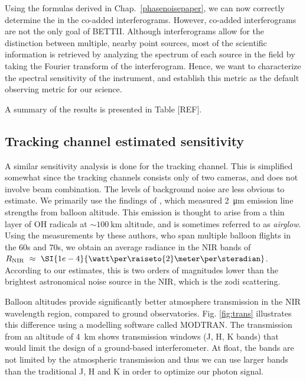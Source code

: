 Using the formulas derived in Chap.~\ref{phasenoisepaper}, we can now correctly determine the \SNR in the co-added interferograms. However, co-added interferograms are not the only goal of BETTII. Although interferograms allow for the distinction between multiple, nearby point sources, most of the scientific information is retrieved by analyzing the spectrum of each source in the field by taking the Fourier transform of the interferogram. Hence, we want to characterize the spectral sensitivity of the instrument, and establish this metric as the default observing metric for our science.

A summary of the results is presented in Table [REF].

\subsection{Tracking channel estimated sensitivity}
A similar sensitivity analysis is done for the tracking channel. This is simplified somewhat since the tracking channels consists only of two cameras, and does not involve beam combination. The levels of background noise are less obvious to estimate. We primarily use the findings of \citet{Matsumoto:1994io}, which measured \SI{2}{\micro\meter} emission line strengths from balloon altitude. This emission is thought to arise from a thin layer of OH radicals at $\sim\SI{100}{\kilo\meter}$ altitude, and is sometimes referred to as \textit{airglow}. Using the measurements by these authors, who span multiple balloon flights in the 60s and 70s, we obtain an average radiance in the NIR bands of $\Rnir~\approx~\SI{1e-4}{\watt\per\raiseto{2}\meter\per\steradian}$. According to our estimates, this is two orders of magnitudes lower than the brightest astronomical noise source in the NIR, which is the zodi scattering.

Balloon altitudes provide significantly better atmosphere transmission in the NIR wavelength region, compared to ground observatories. Fig. \ref{fig:trans} illustrates this difference using a modelling software called MODTRAN. The transmission from an altitude of 4~km shows transmission windows (J, H, K bands) that would limit the design of a ground-based interferometer. At float, the bands are not limited by the atmospheric transmission and thus we can use larger bands than the traditional J, H and K in order to optimize our photon signal.

